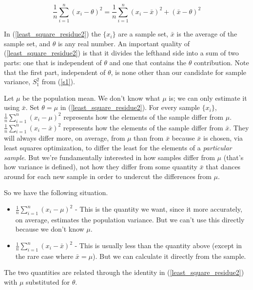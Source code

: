 \documentclass[]{article}
\begin{document}
\begin{equation}
\frac{1}{n} \sum_{i=1}^n (x_i - \theta)^2 =
     \frac{1}{n} \sum_{i=1}^n (x_i - \bar{x})^2 + 
     (\bar{x} - \theta)^2 \label{least_square_residue2}
\end{equation}

In (\ref{least_square_residue2}) the ${\{x_i\}}$ are a sample set,
$\bar{x}$ is the average of the sample set, and $\theta$ is
any real number.  An important quality of (\ref{least_square_residue2})
is that it divides the lefthand side into a sum of two parts:
one that is independent of $\theta$ and one that contains the
$\theta$ contribution.  Note that the first part, independent of
$\theta$, is none other than our candidate for sample variance,
$S_1^2$ from (\ref{s1}).

Let $\mu$ be the population mean.  We don't know what $\mu$ is; we
can only estimate it using $\bar{x}$.  Set $\theta = \mu$ in
(\ref{least_square_residue2}).
For every sample $\{x_i\}$, $\frac{1}{n} \sum_{i=1}^n (x_i - \mu)^2$
represents how the elements of the sample differ from $\mu$.
$\frac{1}{n} \sum_{i=1}^n (x_i - \bar{x})^2$ represents how the
elements of the sample differ from $\bar{x}$.
They will always differ more, on average, from $\mu$ than from
$\bar{x}$ because $\bar{x}$ is chosen, via least squares
optimization, to differ the least
for the elements of a \emph{particular sample}.
But we're fundamentally interested in how samples differ from
$\mu$ (that's how variance is defined), not how they differ from
some quantity $\bar{x}$ that dances around for each new sample
in order to undercut the differences from $\mu$.

So we have the following situation.

\begin{itemize}

\item $\frac{1}{n} \sum_{i=1}^n (x_i - \mu)^2$ - This is the
   quantity we want, since it more accurately, on average,
   estimates the population variance.  But we can't use this
   directly because we don't know $\mu$.

\item $\frac{1}{n} \sum_{i=1}^n (x_i - \bar{x})^2$ - This is
   usually less than the quantity above (except in the rare
   case where $\bar{x} = \mu$).  But we can calculate it
   directly from the sample.

\end{itemize}

The two quantities are related through the identity in
(\ref{least_square_residue2}) with $\mu$ substituted for
$\theta$.
\end{document}
